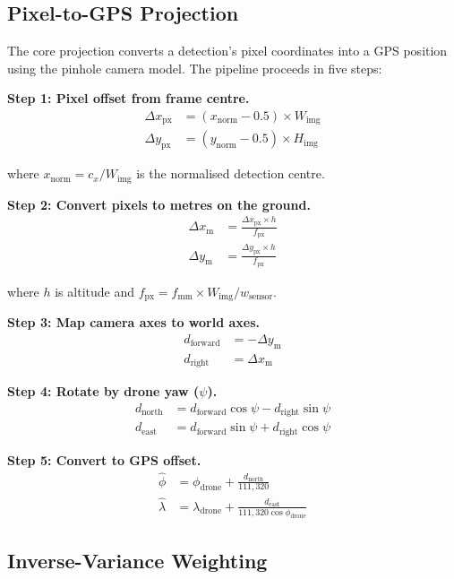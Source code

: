 \subsection{Pixel-to-GPS Projection}

The core projection converts a detection's pixel coordinates into a GPS position
using the pinhole camera model. The pipeline proceeds in five steps:

\textbf{Step 1: Pixel offset from frame centre.}
\begin{align}
    \Delta x_\text{px} &= (x_\text{norm} - 0.5) \times W_\text{img} \\
    \Delta y_\text{px} &= (y_\text{norm} - 0.5) \times H_\text{img}
\end{align}

\noindent where $x_\text{norm} = c_x / W_\text{img}$ is the normalised detection
centre.

\textbf{Step 2: Convert pixels to metres on the ground.}
\begin{align}
    \Delta x_\text{m} &= \frac{\Delta x_\text{px} \times h}{f_\text{px}} \\
    \Delta y_\text{m} &= \frac{\Delta y_\text{px} \times h}{f_\text{px}}
\end{align}

\noindent where $h$ is altitude and $f_\text{px} = f_\text{mm} \times W_\text{img} / w_\text{sensor}$.

\textbf{Step 3: Map camera axes to world axes.}
\begin{align}
    d_\text{forward} &= -\Delta y_\text{m} \\
    d_\text{right} &= \Delta x_\text{m}
\end{align}

\textbf{Step 4: Rotate by drone yaw ($\psi$).}
\begin{align}
    d_\text{north} &= d_\text{forward} \cos\psi - d_\text{right} \sin\psi \\
    d_\text{east} &= d_\text{forward} \sin\psi + d_\text{right} \cos\psi
\end{align}

\textbf{Step 5: Convert to GPS offset.}
\begin{align}
    \hat{\phi} &= \phi_\text{drone} + \frac{d_\text{north}}{111{,}320} \\
    \hat{\lambda} &= \lambda_\text{drone} + \frac{d_\text{east}}
    {111{,}320 \cos \phi_\text{drone}}
\end{align}

\subsection{Inverse-Variance Weighting}

